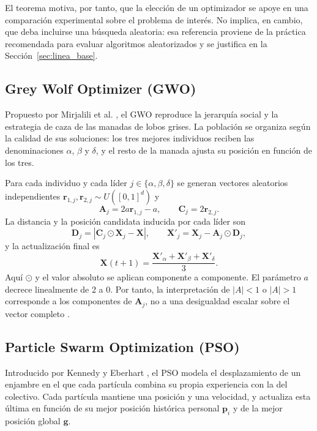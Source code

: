 El teorema motiva, por tanto, que la elección de un optimizador se apoye en una comparación experimental sobre el problema de interés. No implica, en cambio, que deba incluirse una búsqueda aleatoria: esa referencia proviene de la práctica recomendada para evaluar algoritmos aleatorizados \cite{Arcuri2014Hitchhiker} y se justifica en la Sección~\ref{sec:linea_base}.

\subsection{Grey Wolf Optimizer (GWO)}

Propuesto por Mirjalili et al. \cite{Mirjalili2014GWO}, el GWO reproduce la jerarquía social y la estrategia de caza de las manadas de lobos grises. La población se organiza según la calidad de sus soluciones: los tres mejores individuos reciben las denominaciones $\alpha$, $\beta$ y $\delta$, y el resto de la manada ajusta su posición en función de los tres.

Para cada individuo y cada líder $j\in\{\alpha,\beta,\delta\}$ se generan vectores aleatorios independientes $\mathbf r_{1,j},\mathbf r_{2,j}\sim U([0,1]^d)$ y
\begin{equation}
\mathbf A_j=2a\mathbf r_{1,j}-a,\qquad
\mathbf C_j=2\mathbf r_{2,j}.
\end{equation}
La distancia y la posición candidata inducida por cada líder son
\begin{equation}
\mathbf D_j=\left|\mathbf C_j\odot\mathbf X_j-\mathbf X\right|,
\qquad
\mathbf X'_j=\mathbf X_j-\mathbf A_j\odot\mathbf D_j,
\end{equation}
y la actualización final es
\begin{equation}
\mathbf X(t+1)=\frac{\mathbf X'_{\alpha}+\mathbf X'_{\beta}+\mathbf X'_{\delta}}{3}.
\end{equation}
Aquí $\odot$ y el valor absoluto se aplican componente a componente. El parámetro $a$ decrece linealmente de 2 a 0. Por tanto, la interpretación de $|A|<1$ o $|A|>1$ corresponde a los componentes de $\mathbf A_j$, no a una desigualdad escalar sobre el vector completo \cite{Mirjalili2014GWO}.

\subsection{Particle Swarm Optimization (PSO)}

Introducido por Kennedy y Eberhart \cite{Kennedy1995PSO}, el PSO modela el desplazamiento de un enjambre en el que cada partícula combina su propia experiencia con la del colectivo. Cada partícula mantiene una posición y una velocidad, y actualiza esta última en función de su mejor posición histórica personal $\mathbf{p}_i$ y de la mejor posición global $\mathbf{g}$.

